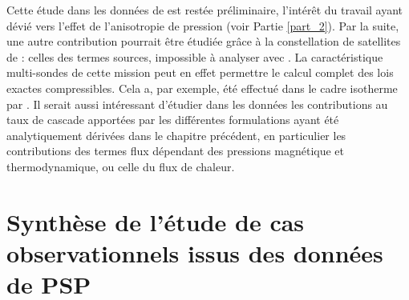  Cette étude dans les données de  est restée préliminaire, l'intérêt du travail ayant dévié vers l'effet de l'anisotropie de pression (voir Partie \ref{part_2}). Par la suite, une autre contribution pourrait être étudiée grâce à la constellation de satellites de  : celles des termes sources, impossible à analyser avec . La caractéristique multi-sondes de cette mission peut en effet permettre le calcul complet des lois exactes compressibles. Cela a, par exemple, été effectué dans le cadre isotherme par \cite{andres_energy_2019}. Il serait aussi intéressant d'étudier dans les données les contributions au taux de cascade apportées par les différentes formulations ayant été analytiquement dérivées dans le chapitre précédent, en particulier les contributions des termes flux dépendant des pressions magnétique et thermodynamique, ou celle du flux de chaleur.

\newpage
\section{Synthèse de l'étude de cas observationnels issus des données de PSP}
\label{synt-14}

